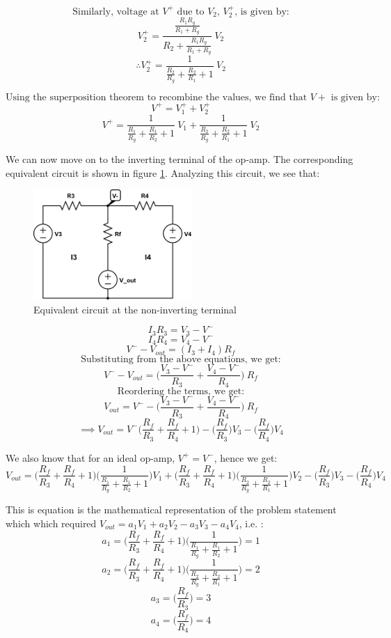 \documentclass{article}
\theoremstyle{plain}
\theoremstyle{definition}
\theoremstyle{remark}
\begin{document}
$$\text{Similarly, voltage at $V^+$ due to $V_2$, $V^+_2$, is given by:}$$
$$V^+_2 = \frac{\frac{R_1 R_g}{R_1+R_g}}{R_2 + \frac{R_1 R_g}{R_1+R_g}}\ V_2$$
$$\therefore  V^+_2 = \frac{1}{\frac{R_2}{R_g} + \frac{R_2}{R_1} + 1} \ V_2$$

$$\text{Using the superposition theorem to recombine the values, we find that $V+$ is given by:}$$
$$V^+ = V^+_1 + V^+_2 $$
$$V^+ = \frac{1}{\frac{R_1}{R_g} + \frac{R_1}{R_2} + 1} \ V_1 + \frac{1}{\frac{R_2}{R_g} + \frac{R_2}{R_1} + 1} \ V_2 $$

We can now move on to the inverting terminal of the op-amp. The corresponding equivalent circuit is shown in figure \ref{q2_b2}.  Analyzing this circuit, we see that:
\begin{figure}[h]
\begin{center}
\includegraphics[width=6cm]{lab1_q2_kvl2.png}
\end{center}
\caption{Equivalent circuit at the non-inverting terminal}
\label{q2_b2}
\end{figure}
$$I_3R_3 = V_3 - V^-$$
$$I_4R_4 = V_4 - V^-$$
$$V^- - V_{out} = (I_3 + I_4)R_f $$
$$\text{Substituting from the above equations, we get:}$$
$$ V^- - V_{out} = \Big( \frac{ V_3 - V^-}{R_3} + \frac{ V_4 - V^-}{R_4}\Big) \ R_f$$
$$\text{Reordering the terms, we get:}$$
$$V_{out} =V^- -  \Big( \frac{ V_3 - V^-}{R_3} + \frac{ V_4 - V^-}{R_4}\Big) \ R_f $$
$$\implies V_{out} =V^- \Big( \frac{R_f}{R_3} + \frac{ R_f}{R_4} + 1\Big) - \Big( \frac{R_f}{R_3}\Big)V_3 - \Big( \frac{ R_f}{R_4}\Big)V_4$$

We also know that for an ideal op-amp, $V^+ = V^-$, hence we get:
$$ V_{out} = \Big( \frac{R_f}{R_3} + \frac{ R_f}{R_4} + 1\Big) \Big( \frac{1}{\frac{R_1}{R_g} + \frac{R_1}{R_2} + 1}\Big) V_1 + \Big( \frac{R_f}{R_3} + \frac{ R_f}{R_4} + 1\Big) \Big( \frac{1}{\frac{R_2}{R_g} + \frac{R_2}{R_1} + 1} \Big) V_2 - \Big( \frac{R_f}{R_3}\Big)V_3 - \Big( \frac{ R_f}{R_4}\Big)V_4$$

This is equation is the mathematical representation of the problem statement which which required $V_{out} = a_1V_1 + a_2 V_2 - a_3 V_3 - a_4 V_4$, i.e. :
$$a_1 =  \Big( \frac{R_f}{R_3} + \frac{ R_f}{R_4} + 1\Big) \Big( \frac{1}{\frac{R_1}{R_g} + \frac{R_1}{R_2} + 1}\Big) = 1$$
$$a_2 =  \Big( \frac{R_f}{R_3} + \frac{ R_f}{R_4} + 1\Big) \Big( \frac{1}{\frac{R_2}{R_g} + \frac{R_2}{R_1} + 1} \Big) = 2$$
$$a_3 = \Big( \frac{R_f}{R_3}\Big) = 3$$
$$a_4 = \Big( \frac{ R_f}{R_4}\Big) = 4$$
\end{document}
